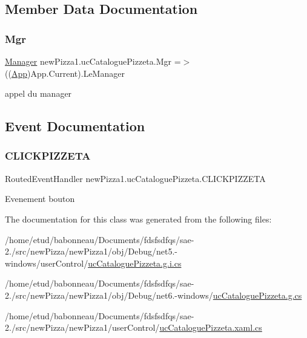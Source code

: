 \subsection{Member Data Documentation}
\mbox{\label{classnewPizza1_1_1ucCataloguePizzeta_a272bf4809df4cc2080aca3c979521362}} 
\subsubsection{\texorpdfstring{Mgr}{Mgr}}
{\footnotesize\ttfamily \hyperlink{classModele_1_1Manager}{Manager} new\+Pizza1.\+uc\+Catalogue\+Pizzeta.\+Mgr =$>$ ((\hyperlink{classnewPizza1_1_1App}{App})App.\+Current).Le\+Manager}



appel du manager 



\subsection{Event Documentation}
\mbox{\label{classnewPizza1_1_1ucCataloguePizzeta_aa3f29ddf7b6144578905faf1b7e4a330}} 
\subsubsection{\texorpdfstring{C\+L\+I\+C\+K\+P\+I\+Z\+Z\+E\+TA}{CLICKPIZZETA}}
{\footnotesize\ttfamily Routed\+Event\+Handler new\+Pizza1.\+uc\+Catalogue\+Pizzeta.\+C\+L\+I\+C\+K\+P\+I\+Z\+Z\+E\+TA}



Evenement bouton 



The documentation for this class was generated from the following files\+:\begin{DoxyCompactItemize}
\item 
/home/etud/babonneau/\+Documents/fdsfsdfqs/sae-\/2./src/new\+Pizza/new\+Pizza1/obj/\+Debug/net5.-\/windows/user\+Control/\hyperlink{net5_80-windows_2userControl_2ucCataloguePizzeta_8g_8i_8cs}{uc\+Catalogue\+Pizzeta.\+g.\+i.\+cs}\item 
/home/etud/babonneau/\+Documents/fdsfsdfqs/sae-\/2./src/new\+Pizza/new\+Pizza1/obj/\+Debug/net6.-\/windows/\hyperlink{Debug_2net6_80-windows_2ucCataloguePizzeta_8g_8cs}{uc\+Catalogue\+Pizzeta.\+g.\+cs}\item 
/home/etud/babonneau/\+Documents/fdsfsdfqs/sae-\/2./src/new\+Pizza/new\+Pizza1/user\+Control/\hyperlink{ucCataloguePizzeta_8xaml_8cs}{uc\+Catalogue\+Pizzeta.\+xaml.\+cs}\end{DoxyCompactItemize}
